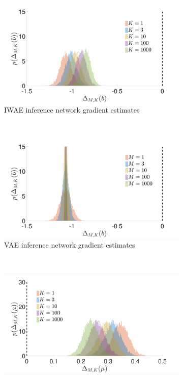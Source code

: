 \begin{figure}[h]
	\centering
	\begin{subfigure}[b]{0.45\textwidth}
		\centering
		\includegraphics[width=\textwidth]{figures/tighter_bounds/hv_b_hist_IWAE}
		\caption{\gls{IWAE} inference network gradient estimates \label{fig:hv/b_hist_iwae}}
	\end{subfigure} ~~~~~~~~~~
	\begin{subfigure}[b]{0.45\textwidth}
		\centering
		\includegraphics[width=\textwidth]{figures/tighter_bounds/hv_b_hist_VAE}
		\caption{\gls{VAE} inference network gradient estimates \label{fig:hv/b_hist_vae}}
	\end{subfigure}\\
	\begin{subfigure}[b]{0.45\textwidth}
		\centering
		\includegraphics[width=\textwidth]{figures/tighter_bounds/hv_mu_hist_IWAE}

\end{subfigure}
\end{figure}
